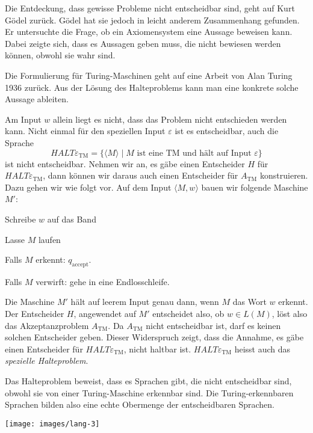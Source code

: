 %
Die Entdeckung, dass gewisse Probleme nicht entscheidbar sind,
geht auf Kurt Gödel zurück.
Gödel hat sie jedoch in leicht anderem Zusammenhang gefunden.
Er untersuchte die Frage, ob ein
Axiomensystem eine Aussage beweisen kann.
Dabei zeigte sich,
dass es Aussagen geben muss, die nicht bewiesen werden können,
obwohl sie wahr sind.

Die Formulierung für Turing-Maschinen geht auf eine Arbeit von
Alan Turing 1936 zurück.
%
Aus der Lösung des Halteproblems kann
man eine konkrete solche Aussage ableiten.

Am Input $w$ allein liegt es nicht, dass das Problem nicht
entschieden werden kann.
Nicht einmal für den speziellen Input $\varepsilon$ ist es
entscheidbar, auch die Sprache
\[
\textit{HALT}\varepsilon_{\text{TM}}
=\{
\langle M\rangle \;|\;
\text{$M$ ist eine TM und hält auf Input $\varepsilon$}
\}
\]
%
ist nicht entscheidbar.
Nehmen wir an, es gäbe einen
Entscheider $H$ für $\textit{HALT}\varepsilon_{\text{TM}}$, dann können wir daraus
auch einen Entscheider für $A_{\text{TM}}$ konstruieren.
Dazu gehen wir wie folgt vor.
Auf dem Input $\langle M,w\rangle$ bauen wir folgende Maschine $M'$:
\medskip
\begin{compactenum}
\item Schreibe $w$ auf das Band
\item Lasse $M$ laufen
\item Falls $M$ erkennt: $q_{\text{accept}}$.
\item Falls $M$ verwirft: gehe in eine Endlosschleife.
\end{compactenum}
\medskip
Die Maschine $M'$ hält auf leerem Input genau dann, wenn $M$
das Wort $w$ erkennt.
Der Entscheider $H$, angewendet auf $M'$
entscheidet also, ob $w\in L(M)$, löst also das Akzeptanzproblem
$A_{\text{TM}}$.
Da $A_{\text{TM}}$ nicht entscheidbar ist, darf es keinen solchen
Entscheider geben.
Dieser Widerspruch zeigt, dass die Annahme, es
gäbe einen Entscheider für $\textit{HALT}\varepsilon_{\text{TM}}$,
nicht haltbar ist.
$\textit{HALT}\varepsilon_{\text{TM}}$ heisst
auch das {\em spezielle Halteproblem}.
%

Das Halteproblem beweist, dass es Sprachen gibt, die nicht
entscheidbar sind, obwohl sie von einer Turing-Maschine
erkennbar sind.
Die Turing-erkennbaren Sprachen bilden also eine
echte Obermenge der entscheidbaren Sprachen.
\begin{center}
\texttt{[image: images/lang-3]}
\end{center}

